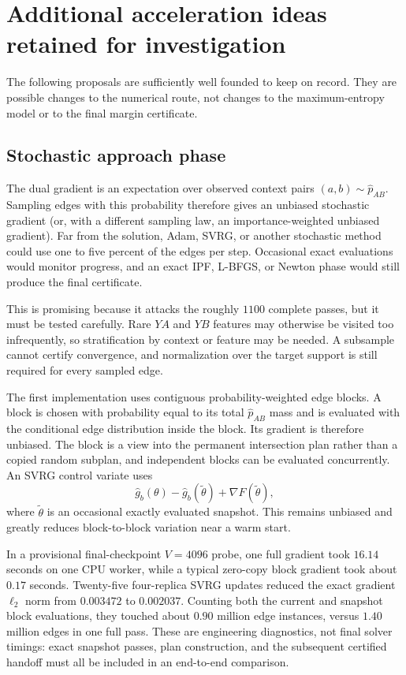 \documentclass[11pt]{article}
\begin{document}
\section{Additional acceleration ideas retained for investigation}

The following proposals are sufficiently well founded to keep on record.
They are possible changes to the numerical route, not changes to the
maximum-entropy model or to the final margin certificate.

\subsection{Stochastic approach phase}

The dual gradient is an expectation over observed context pairs
$(a,b)\sim\widehat p_{AB}$.  Sampling edges with this probability therefore
gives an unbiased stochastic gradient (or, with a different sampling law, an
importance-weighted unbiased gradient).  Far from the solution, Adam, SVRG,
or another stochastic method could use one to five percent of the edges per
step.  Occasional exact evaluations would monitor progress, and an exact
IPF, L-BFGS, or Newton phase would still produce the final certificate.

This is promising because it attacks the roughly $1100$ complete passes,
but it must be tested carefully.  Rare $YA$ and $YB$ features may otherwise
be visited too infrequently, so stratification by context or feature may be
needed.  A subsample cannot certify convergence, and normalization over the
target support is still required for every sampled edge.

The first implementation uses contiguous probability-weighted edge blocks.
A block is chosen with probability equal to its total $\widehat p_{AB}$ mass
and is evaluated with the conditional edge distribution inside the block.
Its gradient is therefore unbiased.  The block is a view into the permanent
intersection plan rather than a copied random subplan, and independent blocks
can be evaluated concurrently.  An SVRG control variate uses
\[
 \widehat g_b(\theta)-\widehat g_b(\widetilde\theta)
 +\nabla F(\widetilde\theta),
\]
where $\widetilde\theta$ is an occasional exactly evaluated snapshot.  This
remains unbiased and greatly reduces block-to-block variation near a warm
start.

In a provisional final-checkpoint $V=4096$ probe, one full gradient took
$16.14$ seconds on one CPU worker, while a typical zero-copy block gradient
took about $0.17$ seconds.  Twenty-five four-replica SVRG updates reduced the
exact gradient $\ell_2$ norm from $0.003472$ to $0.002037$.  Counting both the
current and snapshot block evaluations, they touched about $0.90$ million
edge instances, versus $1.40$ million edges in one full pass.  These are
engineering diagnostics, not final solver timings: exact snapshot passes,
plan construction, and the subsequent certified handoff must all be included
in an end-to-end comparison.
\end{document}
